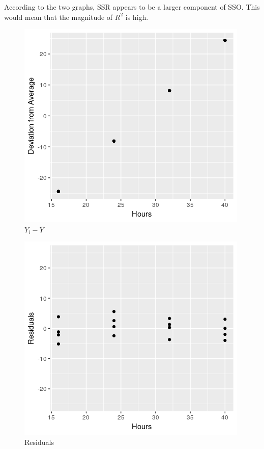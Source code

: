 \documentclass[11pt]{article}
\begin{document}
According to the two graphs, SSR appears to be a larger component of SSO. This
would mean that the magnitude of \(R^2\) is high.

\begin{figure}[htbp]
\centering
\includegraphics[width=.9\linewidth]{./images/2.26c_1.png}
\caption{\(Y_i - \bar{Y}\)}
\end{figure}

\begin{figure}[htbp]
\centering
\includegraphics[width=.9\linewidth]{./images/2.26c_2.png}
\caption{Residuals}
\end{figure}
\end{document}
